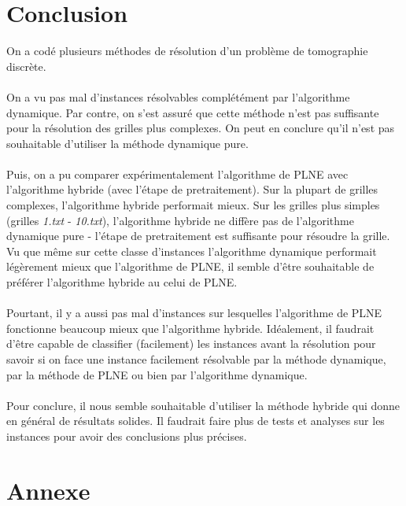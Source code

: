 \documentclass[10pt,a4paper]{article}
\begin{document}
\section*{Conclusion}
\noindent
On a codé plusieurs méthodes de résolution d'un problème de tomographie discrète. \\ \\
\noindent
On a vu pas mal d'instances résolvables complétément par l'algorithme dynamique. Par contre, on s'est assuré que cette méthode n'est pas suffisante pour la résolution des grilles plus complexes. On peut en conclure qu'il n'est pas souhaitable d'utiliser la méthode dynamique pure. \\ \\
\noindent
Puis, on a pu comparer expérimentalement l'algorithme de PLNE avec l'algorithme hybride (avec l'étape de pretraitement). Sur la plupart de grilles complexes, l'algorithme hybride performait mieux. Sur les grilles plus simples (grilles \textit{1.txt} - \textit{10.txt}), l'algorithme hybride ne diffère pas de l'algorithme dynamique pure - l'étape de pretraitement est suffisante pour résoudre la grille. Vu que même sur cette classe d'instances l'algorithme dynamique performait légèrement mieux que l'algorithme de PLNE, il semble d'être souhaitable de préférer l'algorithme hybride au celui de PLNE. \\ \\
\noindent
Pourtant, il y a aussi pas mal d'instances sur lesquelles l'algorithme de PLNE fonctionne beaucoup mieux que l'algorithme hybride. Idéalement, il faudrait d'être capable de classifier (facilement) les instances avant la résolution pour savoir si on face une instance facilement résolvable par la méthode dynamique, par la méthode de PLNE ou bien par l'algorithme dynamique. \\ \\
\noindent
Pour conclure, il nous semble souhaitable d'utiliser la méthode hybride qui donne en général de résultats solides. Il faudrait faire plus de tests et analyses sur les instances pour avoir des conclusions plus précises. \\  
\noindent 
\newpage
\section*{Annexe}
\end{document}
